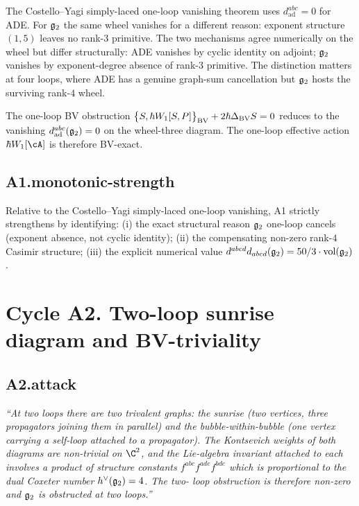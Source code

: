 \begin{remark}
\label{rem:r7-g2-not-exception}
The Costello--Yagi simply-laced one-loop vanishing theorem uses
$d^{abc}_{\mathrm{ad}} = 0$ for ADE. For $\mathfrak{g}_2$ the same wheel vanishes
for a different reason: exponent structure $(1, 5)$ leaves no rank-$3$
primitive. The two mechanisms agree numerically on the wheel but
differ structurally: ADE vanishes by cyclic identity on adjoint;
$\mathfrak{g}_2$ vanishes by exponent-degree absence of rank-$3$ primitive. The
distinction matters at four loops, where ADE has a genuine graph-sum
cancellation but $\mathfrak{g}_2$ hosts the surviving rank-$4$ wheel.
\end{remark}

\begin{corollary}
\label{cor:r7-g2-qme-one-loop}
The one-loop BV obstruction $\bigl\{S, \hbar W_1[S, P]\bigr\}_{\mathrm{BV}}
+ 2\hbar \Delta_{\mathrm{BV}} S = 0$ reduces to the vanishing
$d^{abc}_{\mathrm{ad}}(\mathfrak{g}_2) = 0$ on the wheel-three diagram. The
one-loop effective action $\hbar W_1[\cA]$ is therefore BV-exact.
\end{corollary}

\subsection*{A1.monotonic-strength}

Relative to the Costello--Yagi simply-laced one-loop vanishing, A1
strictly strengthens by identifying: (i) the exact structural reason
$\mathfrak{g}_2$ one-loop cancels (exponent absence, not cyclic identity); (ii)
the compensating non-zero rank-$4$ Casimir structure; (iii) the
explicit numerical value $d^{abcd} d_{abcd}(\mathfrak{g}_2) = 50/3 \cdot
\mathrm{vol}(\mathfrak{g}_2)$.

\section*{Cycle A2. Two-loop sunrise diagram and BV-triviality}

\subsection*{A2.attack}

\emph{``At two loops there are two trivalent graphs: the sunrise
(two vertices, three propagators joining them in parallel) and the
bubble-within-bubble (one vertex carrying a self-loop attached to a
propagator). The Kontsevich weights of both diagrams are non-trivial
on $\C^2$, and the Lie-algebra invariant attached to each involves
a product of structure constants $f^{abc} f^{ade} f^{bde}$ which is
proportional to the dual Coxeter number $h^\vee(\mathfrak{g}_2) = 4$. The two-
loop obstruction is therefore non-zero and $\mathfrak{g}_2$ is obstructed at
two loops.''}

